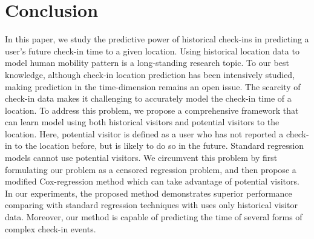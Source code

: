 \section{Conclusion} \label{sec:conclusion}

In this paper, we study the predictive power of historical check-ins in predicting a user's future check-in time to a given location. Using historical location data to model human mobility pattern is a long-standing research topic. To our best knowledge, although check-in location prediction has been intensively studied, making prediction in the time-dimension remains an open issue.  The scarcity of check-in data makes it challenging to accurately model the check-in time of a location. To address this problem, we propose a comprehensive framework that can learn model using both historical visitors and potential visitors to the location. Here, potential visitor is defined as a user who has not reported a check-in to the location before, but is likely to do so in the future. Standard regression models cannot use potential visitors. We circumvent this problem by first formulating our problem as a censored regression problem, and then propose a modified Cox-regression method which can take advantage of potential visitors. In our experiments, the proposed method demonstrates superior performance comparing with standard regression techniques with uses only historical visitor data. Moreover, our method is capable of predicting the time of several forms of complex check-in events.

